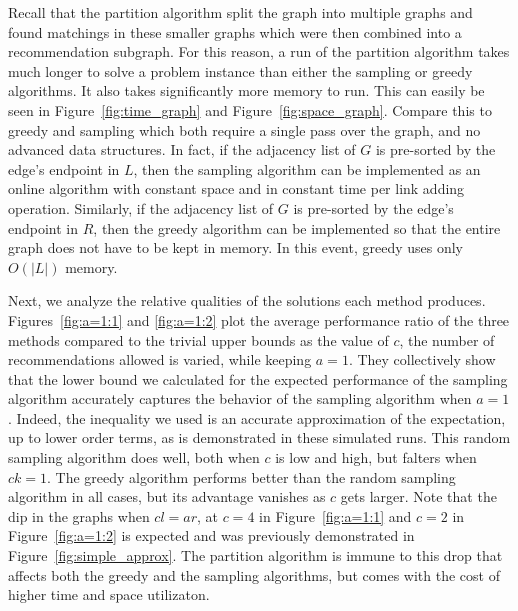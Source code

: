 Recall that the partition algorithm split the graph into multiple graphs
and found matchings in these smaller graphs which were then combined into
a recommendation subgraph. For this reason, a run of the partition
algorithm takes much longer to solve a problem instance than either the
sampling or greedy algorithms. It also takes significantly more memory to
run. This can easily be seen in Figure~\ref{fig:time_graph} and Figure~\ref{fig:space_graph}.
Compare this to greedy and sampling which both require a single pass over
the graph, and no advanced data structures. In fact, if the adjacency list
of $G$ is pre-sorted by the edge's endpoint in $L$, then the sampling algorithm can be
implemented as an online algorithm with constant space and in constant time 
per link adding operation. Similarly, if the adjacency list of $G$
is pre-sorted by the edge's endpoint in $R$, then the greedy algorithm can
be implemented so that the entire graph does not have to be kept in memory. In this
event, greedy uses only $O(|L|)$ memory.\vs

Next, we analyze the relative qualities of the solutions each method produces.
Figures~\ref{fig:a=1:1} and \ref{fig:a=1:2} plot the average performance ratio of the three methods compared to the trivial upper bounds as the value of $c$, the number of recommendations allowed is varied, while keeping $a = 1$. 
They collectively show that the lower bound we calculated for the expected performance of the sampling
algorithm accurately captures the behavior of the sampling algorithm
when $a=1$. Indeed, the inequality we used is an accurate
approximation of the expectation, up to lower order terms, as is demonstrated in these simulated runs.
This random
sampling algorithm does well, both when $c$ is low and high, but
falters when $ck=1$. The greedy algorithm performs better than the
random sampling algorithm in all cases, but its advantage vanishes as
$c$ gets larger. Note that the dip in the graphs when $cl=ar$, at
$c=4$ in Figure~\ref{fig:a=1:1} and $c=2$ in Figure~\ref{fig:a=1:2} is
expected and was previously demonstrated in Figure~\ref{fig:simple_approx}.
The partition algorithm is immune to this drop that affects both the greedy
and the sampling algorithms, but comes with the cost of higher time and space utilizaton.

